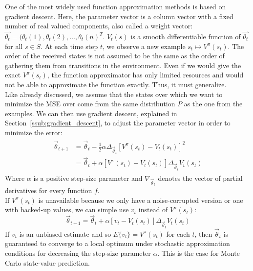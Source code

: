 One of the most widely used function approximation methods is based on gradient descent. Here, the parameter vector is a column vector with a fixed number of real valued components, also called a weight vector: $\overrightarrow{\theta_t} = (\theta_t(1), \theta_t(2), \dots, \theta_t(n)^T$. $V_t(s)$ is a smooth differentiable function of $\overrightarrow{\theta_t}$ for all $s \in S$.
At each time step $t$, we observe a new example $s_t \mapsto V^{\pi}(s_t)$.
The order of the received states is not assumed to be the same as the order of gathering them from transitions in the environment.
Even if we would give the exact $V^{\pi}(s_t)$, the function approximator has only limited resources and would not be able to approximate the function exactly. Thus, it must generalize.\\
Like already discussed, we assume that the states over which we want to minimize the MSE over come from the same distribution $P$ as the one from the examples.
We can then use gradient descent, explained in Section~\ref{ssub:gradient_descent}, to adjust the parameter vector in order to minimize the error:
\begin{align}
\begin{split}
\overrightarrow{\theta}_{t+1} &= \overrightarrow{\theta}_t - \frac{1}{2} \alpha \Delta_{\overrightarrow{\theta}_t} \left[ V^{\pi}(s_t) - V_t(s_t) \right]^2\\
&= \overrightarrow{\theta}_t + \alpha \left[ V^{\pi}(s_t) - V_t(s_t) \right] \Delta_{\overrightarrow{\theta}_t} V_t(s_t)
\end{split}
\end{align}
Where $\alpha$ is a positive step-size parameter and $\nabla_{\overrightarrow{\theta}_t}$ denotes the vector of partial derivatives for every function $f$.\\
If $V^{\pi}(s_t)$ is unavailable because we only have a noise-corrupted version or one with backed-up values, we can simple use $v_t$ instead of $V^{\pi}(s_t)$:
\begin{equation}
\overrightarrow{\theta}_{t+1} = \overrightarrow{\theta}_t + \alpha \left[ v_t - V_t(s_t) \right] \Delta_{\overrightarrow{\theta}_t} V_t(s_t)
\end{equation}
If $v_t$ is an unbiased estimate and so $E\{v_t\} = V^{\pi}(s_t)$ for each $t$, then $\overrightarrow{\theta}_t$ is guaranteed to converge to a local optimum under stochastic approximation conditions for decreasing the step-size parameter $\alpha$. This is the case for Monte Carlo state-value prediction.\\

